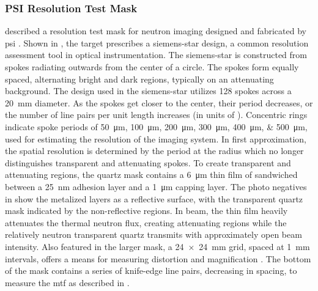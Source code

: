 \documentclass[../../../../main.tex]{subfiles}%
\begin{document}
%
    \subsubsection*{PSI Resolution Test Mask}%
    \label{sec:chapter-3:beamline-testing:imaging-targets:psi-test-masks}%
    \citeauthor*{Grunzweig_2007} described a resolution test mask for neutron imaging designed and fabricated by \gls{psi} \cite{website:Paul_Scherrer_Institute}.
    Shown in , the target prescribes a \gls{siemens-star} design, a common resolution assessment tool in optical instrumentation.
    The \gls{siemens-star} is constructed from spokes radiating outwards from the center of a circle.
    The spokes form equally spaced, alternating bright and dark regions, typically on an attenuating background.
    The design used in the \gls{siemens-star} utilizes \num{128} spokes across a \SI{20}{\milli\meter} diameter.
    As the spokes get closer to the center, their period decreases, or the number of line pairs per unit length increases (in units of \si{\linepairs}).
    Concentric rings indicate spoke periods of \SIlist[list-units=single]{50;100;200;300;400;500}{\micro\meter}, used for estimating the resolution of the imaging system.
    In first approximation, the spatial resolution is determined by the period at the radius which no longer distinguishes transparent and attenuating spokes.
    To create transparent and attenuating regions, the quartz mask contains a \SI{6}{\micro\meter} thin film of  sandwiched between a \SI{25}{\nano\meter} adhesion layer and a \SI{1}{\micro\meter} capping layer.
    The photo negatives in  show the metalized layers as a reflective surface, with the transparent quartz mask indicated by the non-reflective regions.
    In beam, the  thin film heavily attenuates the thermal neutron flux, creating attenuating regions while the relatively neutron transparent quartz transmits with approximately open beam intensity. 
    Also featured in the larger mask, a \SI[product-units=power]{24 x 24}{\milli\meter} grid, spaced at \SI{1}{\milli\meter} intervals, offers a means for measuring distortion and magnification \cite{Grunzweig_2007}.
    The bottom of the mask contains a series of knife-edge line pairs, decreasing in spacing, to measure the \gls{mtf} as described in . 
\end{document}
